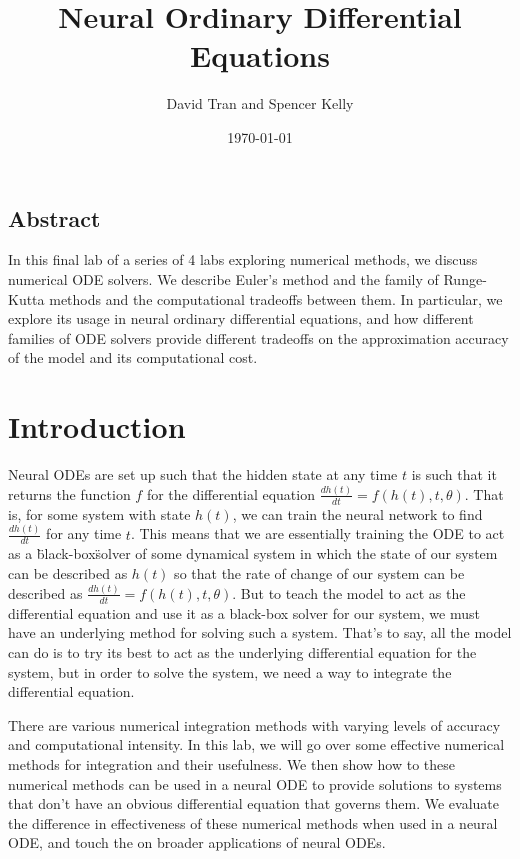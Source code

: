 \documentclass[11pt]{article}
\title{Neural Ordinary Differential Equations}
\author{David Tran and Spencer Kelly}
\date{\today}
\begin{document}
\maketitle

\subsection*{Abstract}

In this final lab of a series of 4 labs exploring numerical methods, we discuss numerical ODE solvers. We describe Euler's method and the family of Runge-Kutta methods and the computational tradeoffs between them. In particular, we explore its usage in neural ordinary differential equations, and how different families of ODE solvers provide different tradeoffs on the approximation accuracy of the model and its computational cost.

\section{Introduction}
  Neural ODEs are set up such that the hidden state at any time $t$ is such that it returns the function $f$ for the differential equation $\frac{dh(t)}{dt} = f(h(t),t,\theta)$.
  That is, for some system with state $h(t)$, we can train the neural network to find $\frac{dh(t)}{dt}$ for any time $t$.
    This means that we are essentially training the ODE to act as a \"black-box\" solver of some dynamical system in which the state of our system can be described as $h(t)$ so that the rate of change of our system can be described as $\frac{dh(t)}{dt} = f(h(t),t,\theta)$.
    But to teach the model to act as the differential equation and use it as a black-box solver for our system, we must have an underlying method for solving such a system.
    That's to say, all the model can do is to try its best to act as the underlying differential equation for the system, but in order to solve the system, we need a way to integrate the differential equation.

  There are various numerical integration methods with varying levels of accuracy and computational intensity.
  In this lab, we will go over some effective numerical methods for integration and their usefulness.
  We then show how to these numerical methods can be used in a neural ODE to provide solutions to systems that don't have an obvious differential equation that governs them.
  We evaluate the difference in effectiveness of these numerical methods when used in a neural ODE, and touch the on broader applications of neural ODEs.
\end{document}
